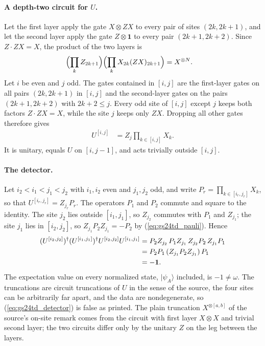 \documentclass{article}
\begin{document}
\paragraph{A depth-two circuit for $U$.} Let the first layer apply the gate
$X\otimes ZX$ to every pair of sites $(2k,2k+1)$, and let the second layer apply
the gate $Z\otimes\mathbf 1$ to every pair $(2k+1,2k+2)$. Since $Z\cdot ZX=X$, the
product of the two layers is
\begin{align}
    \Bigl(\prod_kZ_{2k+1}\Bigr)\Bigl(\prod_kX_{2k}(ZX)_{2k+1}\Bigr)
     & =X^{\otimes N}.
    \label{eq:gs24td_circuit}
\end{align}
Let $i$ be even and $j$ odd. The gates contained in $[i,j]$ are the first-layer
gates on all pairs $(2k,2k+1)$ in $[i,j]$ and the second-layer gates on the pairs
$(2k+1,2k+2)$ with $2k+2\leq j$. Every odd site of $[i,j]$ except $j$ keeps both
factors $Z\cdot ZX=X$, while the site $j$ keeps only $ZX$. Dropping all other
gates therefore gives
\begin{align}
    U^{[i,j]}
     & =Z_j\prod_{k\in[i,j]}X_k.
    \label{eq:gs24td_truncation}
\end{align}
It is unitary, equals $U$ on $[i,j-1]$, and acts trivially outside $[i,j]$.

\paragraph{The detector.} Let $i_2<i_1<j_1<j_2$ with $i_1,i_2$ even and
$j_1,j_2$ odd, and write $P_r=\prod_{k\in[i_r,j_r]}X_k$, so that
$U^{[i_r,j_r]}=Z_{j_r}P_r$. The operators $P_1$ and $P_2$ commute and square to
the identity. The site $j_2$ lies outside $[i_1,j_1]$, so $Z_{j_2}$ commutes with
$P_1$ and $Z_{j_1}$; the site $j_1$ lies in $[i_2,j_2]$, so
$Z_{j_1}P_2Z_{j_1}=-P_2$ by (\ref{eq:gs24td_pauli}). Hence
\begin{align}
    (U^{[i_2,j_2]})^\dagger(U^{[i_1,j_1]})^\dagger U^{[i_2,j_2]}U^{[i_1,j_1]}
     & =P_2Z_{j_2}\,P_1Z_{j_1}\,Z_{j_2}P_2\,Z_{j_1}P_1
    \notag                                                     \\
     & =P_2P_1\,(Z_{j_1}P_2Z_{j_1})\,P_1
    \notag                                                     \\
     & =-\mathbf 1.
    \label{eq:gs24td_minus_one}
\end{align}
The expectation value on every normalized state, $\lvert\psi_A\rangle$ included,
is $-1\neq\omega$. The truncations are circuit truncations of $U$ in the sense of
the source, the four sites can be arbitrarily far apart, and the data are
nondegenerate, so (\ref{eq:gs24td_detector}) is false as printed. The plain truncation
$X^{\otimes[a,b]}$ of the source's on-site remark comes from the circuit with
first layer $X\otimes X$ and trivial second layer; the two circuits differ only
by the unitary $Z$ on the leg between the layers.
\end{document}
